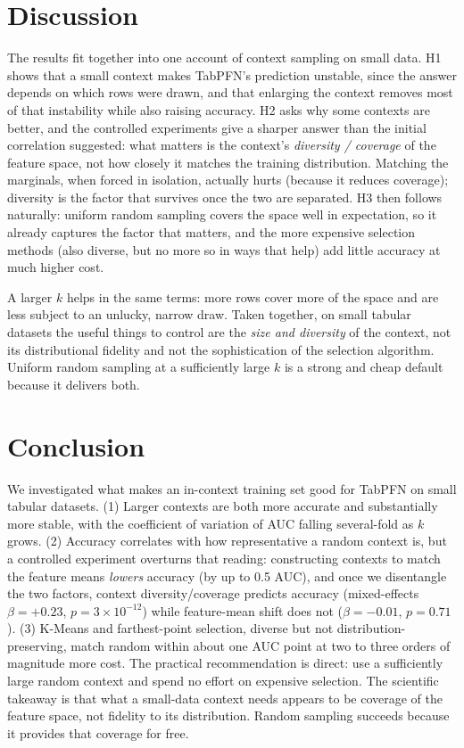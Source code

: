 \documentclass[11pt,a4paper]{article}
\begin{document}
\section{Discussion}

The results fit together into one account of context sampling on small data.
H1 shows that a small context makes TabPFN's prediction unstable, since the
answer depends on which rows were drawn, and that enlarging the context removes
most of that instability while also raising accuracy. H2 asks why some contexts are
better, and the controlled experiments give a sharper answer than the initial
correlation suggested: what matters is the context's \emph{diversity / coverage}
of the feature space, not how closely it matches the training distribution.
Matching the marginals, when forced in isolation, actually hurts (because it
reduces coverage); diversity is the factor that survives once the two are
separated. H3 then follows naturally: uniform random sampling covers the space
well in expectation, so it already captures the factor that matters, and the
more expensive selection methods (also diverse, but no more so in ways that
help) add little accuracy at much higher cost.

A larger $k$ helps in the same terms: more rows cover more of the space and are
less subject to an unlucky, narrow draw. Taken together, on small tabular
datasets the useful things to control are the \emph{size and diversity} of the
context, not its distributional fidelity and not the sophistication of the
selection algorithm. Uniform random sampling at a sufficiently large $k$ is a
strong and cheap default because it delivers both.

\section{Conclusion}

We investigated what makes an in-context training set good for TabPFN on small
tabular datasets. (1) Larger contexts are both more accurate and substantially
more stable, with the coefficient of variation of AUC falling several-fold as
$k$ grows. (2) Accuracy correlates with how representative a random context is,
but a controlled experiment overturns that reading: constructing contexts to
match the feature means \emph{lowers} accuracy (by up to 0.5 AUC), and once we
disentangle the two factors, context diversity/coverage predicts accuracy
(mixed-effects $\beta=+0.23$, $p=3\times10^{-12}$) while feature-mean shift does
not ($\beta=-0.01$, $p=0.71$).
(3) K-Means and farthest-point selection, diverse but not
distribution-preserving, match random within about one AUC point at two to three
orders of magnitude more cost. The practical recommendation is direct: use a
sufficiently large random context and spend no effort on expensive selection. The
scientific takeaway is that what a small-data context needs appears to be
coverage of the feature space, not fidelity to its distribution. Random sampling
succeeds because it provides that coverage for free.
\end{document}
